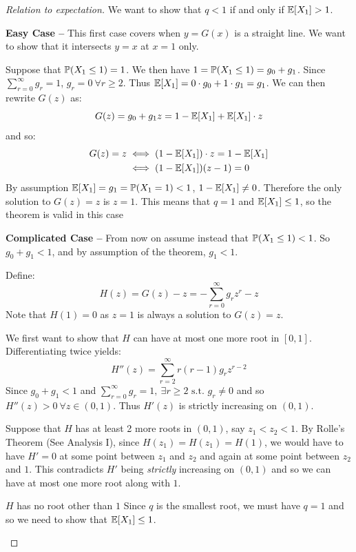 \documentclass[../main.tex]{subfiles}
\begin{document}
\begin{proof}[Relation to expectation]
  We want to show that $q < 1$ if and only if $\E[X_1] > 1$.

  \textbf{Easy Case --} This first case covers when $y = G(x)$ is a straight line.
  We want to show that it intersects $y = x$ at $x = 1$ only.\par
  Suppose that $\P(X_1 \leq 1) = 1$.
  We then have $1 = \P(X_1 \leq 1) = g_0 + g_1$.
  Since $\sum_{r = 0}^{\infty} g_r = 1$, $g_r = 0\ \forall r \geq 2$.
  Thus $\E[X_1] = 0 \cdot g_0 + 1 \cdot g_1 = g_1$.
  We can then rewrite $G(z)$ as:
  \[
    G(z) = g_0 + g_1 z = 1 - \E[X_1] + \E[X_1] \cdot z
  \]
  and so:
  \begin{align*}
    G(z) = z &\iff (1 - \E[X_1]) \cdot z = 1 - \E[X_1] \\
             &\iff (1 - \E[X_1])(z - 1) = 0
  \end{align*}
  By assumption $\E[X_1] = g_1 = \P(X_1 = 1) < 1$, $1 - \E[X_1] \neq 0$.
  Therefore the only solution to $G(z) = z$ is $z = 1$.
  This means that $q = 1$ and $\E[X_1] \leq 1$, so the theorem is valid in this case \tick

  \textbf{Complicated Case --}
  From now on assume instead that $\P(X_1 \leq 1) < 1$.
  So $g_0 + g_1 < 1$, and by assumption of the theorem, $g_1 < 1$.

  Define:
  \[
    H(z) = G(z) - z = -\sum_{r = 0}^{\infty} g_r z^{r} - z
  \]
  Note that $H(1) = 0$ as $z = 1$ is always a solution to $G(z) = z$.

  We first want to show that $H$ can have at most one more root in $[0, 1]$.
  Differentiating twice yields:
  \[
    H''(z) = \sum_{r = 2}^{\infty} r(r - 1)g_r z^{r - 2}
  \]
  Since $g_0 + g_1 < 1$ and $\sum_{r = 0}^{\infty} g_r = 1,\ \exists r \geq 2 \text{ s.t. } g_r \neq 0$ and so $H''(z) > 0\ \forall z \in (0, 1)$.
  Thus $H'(z)$ is strictly increasing on $(0, 1)$.

  Suppose that $H$ has at least 2 more roots in $(0, 1)$, say $z_1 < z_2 < 1$.
  By Rolle's Theorem (See Analysis I), since $H(z_1) = H(z_1) = H(1)$, we would have to have $H' = 0$ at some point between $z_1$ and $z_2$ and again at some point between $z_2$ and $1$.
  This contradicts $H'$ being \textit{strictly} increasing on $(0, 1)$ and so we can have at most one more root along with $1$.
  \begin{proofcases}
    \begin{case}{$H$ has no root other than $1$}
      Since $q$ is the smallest root, we must have $q = 1$ and so we need to show that $\E[X_1] \leq 1$.


\end{case}
\end{proofcases}
\end{proof}
\end{document}
